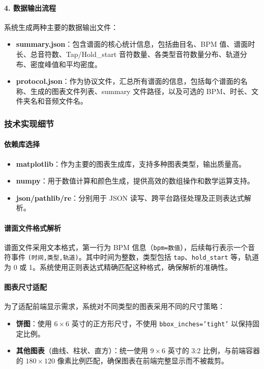 \documentclass[12pt, a4paper]{article}
\begin{document}
\paragraph{4. 数据输出流程}
系统生成两种主要的数据输出文件：
\begin{itemize}
    \item \textbf{summary.json}：包含谱面的核心统计信息，包括曲目名、BPM 值、谱面时长、总音符数、Tap/Hold\_start 音符数量、各类型音符数量分布、轨道分布、密度峰值和平均密度。
    \item \textbf{protocol.json}：作为协议文件，汇总所有谱面的信息，包括每个谱面的名称、生成的图表文件列表、summary 文件路径，以及可选的 BPM、时长、文件夹名和音频文件名。
\end{itemize}

\subsubsection{技术实现细节}

\paragraph{依赖库选择}
\begin{itemize}
    \item \textbf{matplotlib}：作为主要的图表生成库，支持多种图表类型，输出质量高。
    \item \textbf{numpy}：用于数值计算和颜色生成，提供高效的数组操作和数学运算支持。
    \item \textbf{json/pathlib/re}：分别用于 JSON 读写、跨平台路径处理及正则表达式解析。
\end{itemize}

\paragraph{谱面文件格式解析}
谱面文件采用文本格式，第一行为 BPM 信息（\texttt{bpm=数值}），后续每行表示一个音符事件 \texttt{(时间,类型,轨道)}。其中时间为整数，类型包括 \texttt{tap}、\texttt{hold\_start} 等，轨道为 0 或 1。系统使用正则表达式精确匹配这种格式，确保解析的准确性。

\paragraph{图表尺寸适配}
为了适配前端显示需求，系统对不同类型的图表采用不同的尺寸策略：
\begin{itemize}
    \item \textbf{饼图}：使用 $6 \times 6$ 英寸的正方形尺寸，不使用 \texttt{bbox\_inches='tight'} 以保持固定比例。
    \item \textbf{其他图表}（曲线、柱状、直方）：统一使用 $9 \times 6$ 英寸的 3:2 比例，与前端容器的 $180 \times 120$ 像素比例匹配，确保图表在前端完整显示而不被裁剪。
\end{itemize}
\end{document}

